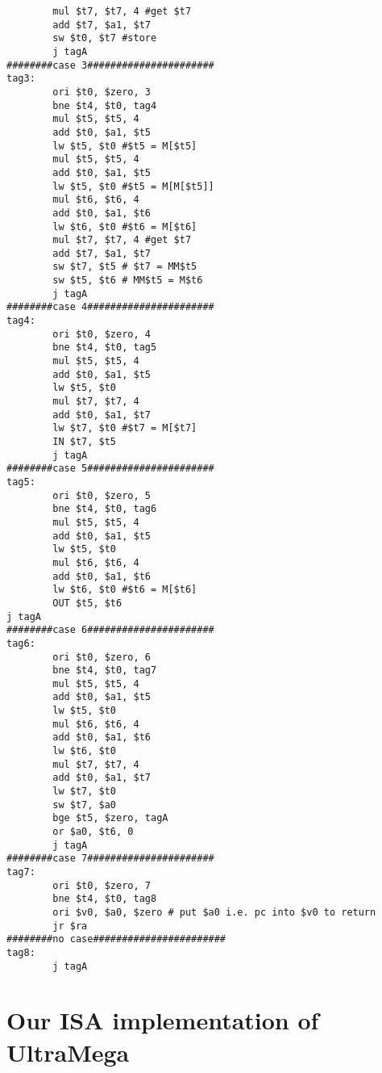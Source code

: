 \documentclass{article}
\begin{document}
\begin{verbatim}
        mul $t7, $t7, 4 #get $t7
        add $t7, $a1, $t7
        sw $t0, $t7 #store
        j tagA
########case 3######################
tag3:
        ori $t0, $zero, 3
        bne $t4, $t0, tag4
        mul $t5, $t5, 4
        add $t0, $a1, $t5
        lw $t5, $t0 #$t5 = M[$t5]
        mul $t5, $t5, 4
        add $t0, $a1, $t5
        lw $t5, $t0 #$t5 = M[M[$t5]]
        mul $t6, $t6, 4
        add $t0, $a1, $t6
        lw $t6, $t0 #$t6 = M[$t6]
        mul $t7, $t7, 4 #get $t7
        add $t7, $a1, $t7
        sw $t7, $t5 # $t7 = MM$t5
        sw $t5, $t6 # MM$t5 = M$t6
        j tagA
########case 4######################
tag4:
        ori $t0, $zero, 4
        bne $t4, $t0, tag5
        mul $t5, $t5, 4
        add $t0, $a1, $t5
        lw $t5, $t0
        mul $t7, $t7, 4
        add $t0, $a1, $t7
        lw $t7, $t0 #$t7 = M[$t7]
        IN $t7, $t5
        j tagA
########case 5######################
tag5:
        ori $t0, $zero, 5
        bne $t4, $t0, tag6
        mul $t5, $t5, 4
        add $t0, $a1, $t5
        lw $t5, $t0
        mul $t6, $t6, 4
        add $t0, $a1, $t6
        lw $t6, $t0 #$t6 = M[$t6]
        OUT $t5, $t6
j tagA
########case 6######################
tag6:
        ori $t0, $zero, 6
        bne $t4, $t0, tag7
        mul $t5, $t5, 4
        add $t0, $a1, $t5
        lw $t5, $t0
        mul $t6, $t6, 4
        add $t0, $a1, $t6
        lw $t6, $t0
        mul $t7, $t7, 4
        add $t0, $a1, $t7
        lw $t7, $t0
        sw $t7, $a0
        bge $t5, $zero, tagA
        or $a0, $t6, 0
        j tagA
########case 7######################
tag7:
        ori $t0, $zero, 7
        bne $t4, $t0, tag8
        ori $v0, $a0, $zero # put $a0 i.e. pc into $v0 to return
        jr $ra
########no case#######################
tag8:
        j tagA
\end{verbatim}

\section{Our ISA implementation of UltraMega}
\end{document}
